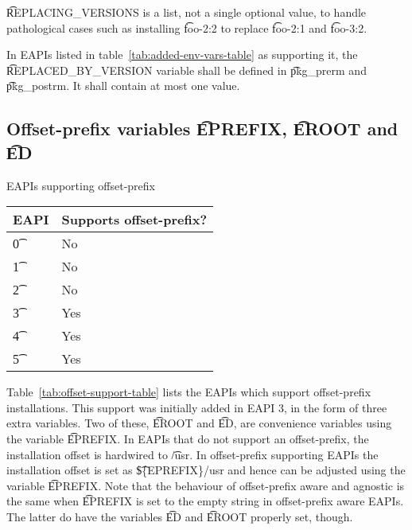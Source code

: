 \t{REPLACING\_VERSIONS} is a list, not a single optional value, to handle pathological cases such as
installing \t{foo-2:2} to replace \t{foo-2:1} and \t{foo-3:2}.

In EAPIs listed in table~\ref{tab:added-env-vars-table} as supporting it, the
\t{REPLACED\_BY\_VERSION} variable shall be defined in \t{pkg\_prerm} and \t{pkg\_postrm}. It shall
contain at most one value.

\subsection{Offset-prefix variables \t{EPREFIX}, \t{EROOT} and \t{ED}}
\label{sec:offset-vars}

\begin{centertable}{EAPIs supporting offset-prefix}
    \label{tab:offset-support-table}
    \begin{tabular}{ l l }
        \toprule
        \multicolumn{1}{c}{\textbf{EAPI}} &
        \multicolumn{1}{c}{\textbf{Supports offset-prefix?}}\\
        \midrule
        \t{0} & No \\
        \t{1} & No \\
        \t{2} & No \\
        \t{3} & Yes \\
        \t{4} & Yes \\
        \t{5} & Yes \\
        \bottomrule
    \end{tabular}
\end{centertable}

 Table~\ref{tab:offset-support-table} lists the EAPIs which support
offset-prefix installations. This support was initially added in EAPI 3, in the form of three extra
variables.  Two of these, \t{EROOT} and \t{ED}, are convenience variables using the variable
\t{EPREFIX}. In EAPIs that do not support an offset-prefix, the installation offset is hardwired to
\t{/usr}. In offset-prefix supporting EAPIs the installation offset is set as \t{\$\{EPREFIX\}/usr}
and hence can be adjusted using the variable \t{EPREFIX}. Note that the behaviour of offset-prefix
aware and agnostic is the same when \t{EPREFIX} is set to the empty string in offset-prefix aware
EAPIs.  The latter do have the variables \t{ED} and \t{EROOT} properly set, though.


